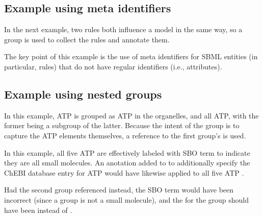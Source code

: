\subsection{Example using meta identifiers}

In the next example, two rules both influence a model in the same way, so a group is used to collect the rules and annotate them.


The key point of this example is the use of meta identifiers for SBML entities (in particular, rules) that do not have regular identifiers (i.e.,  attributes).

\subsection{Example using nested groups}

In this example, ATP is grouped as ATP in the organelles, and all ATP, with the former being a subgroup of the latter.  Because the intent of the group is to capture the ATP elements themselves, a reference to the first group's \ListOfMembers is used.


In this example, all five ATP \Species are effectively labeled with SBO term  to indicate they are all small molecules.  An anotation added to  to additionally specify the ChEBI database entry for ATP would have likewise applied to all five ATP \Species.

Had the second group referenced  instead, the SBO term would have been incorrect (since a group is not a small molecule), and the  for the group should have been  instead of .  

